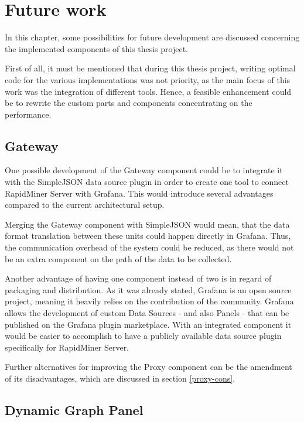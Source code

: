 \chapter{Future work}

In this chapter, some possibilities for future development are discussed concerning the implemented components of this thesis project.

First of all, it must be mentioned that during this thesis project, writing optimal code for the various implementations was not priority, as the main focus of this work was the integration of different tools. Hence, a feasible enhancement could be to rewrite the custom parts and components concentrating on the performance.

\section{Gateway}

One possible development of the Gateway component could be to integrate it with the SimpleJSON data source plugin in order to create one tool to connect RapidMiner Server with Grafana. This would introduce several advantages compared to the current architectural setup.

Merging the Gateway component with SimpleJSON would mean, that the data format translation between these units could happen directly in Grafana. Thus, the communication overhead of the system could be reduced, as there would not be an extra component on the path of the data to be collected.

Another advantage of having one component instead of two is in regard of packaging and distribution. As it was already stated, Grafana is an open source project, meaning it heavily relies on the contribution of the community. Grafana allows the development of custom Data Sources - and also Panels - that can be published on the Grafana plugin marketplace. With an integrated component it would be easier to accomplish to have a publicly available data source plugin specifically for RapidMiner Server.

Further alternatives for improving the Proxy component can be the amendment of its disadvantages, which are discussed in section \ref{proxy-cons}.

\section{Dynamic Graph Panel}

